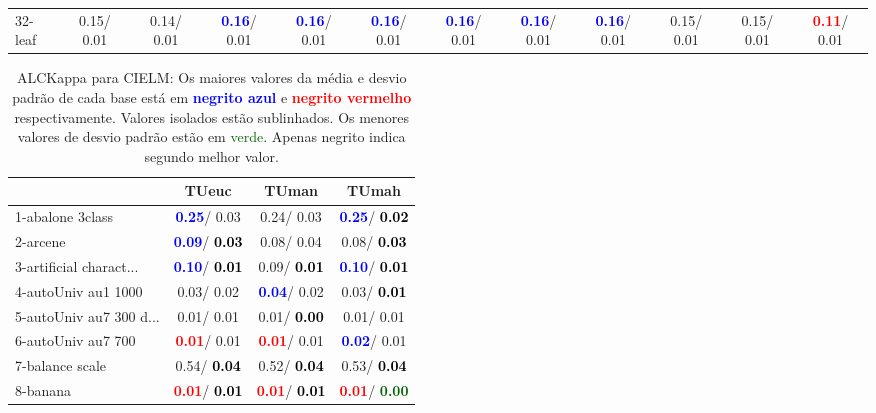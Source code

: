 \begin{table}[h]
\begin{center}
{\begin{tabular}{lc|c|c|c|c|c|c|c|c|c|c}
32-leaf &   0.15/  0.01 &   0.14/  0.01 & \textcolor{blue}{\textbf{  0.16}}/  0.01 & \textcolor{blue}{\textbf{  0.16}}/  0.01 & \textcolor{blue}{\textbf{  0.16}}/  0.01 & \textcolor{blue}{\textbf{  0.16}}/  0.01 & \textcolor{blue}{\textbf{  0.16}}/  0.01 & \textcolor{blue}{\textbf{  0.16}}/  0.01 &   0.15/  0.01 &   0.15/  0.01 & \textcolor{red}{\textbf{  0.11}}/  0.01 \\\end{tabular}}\label{stratsALCKappa0aCIELMRedux}
\end{center}
\end{table}
\begin{table}[h]
\caption{ALCKappa para CIELM: Os maiores valores da média e desvio padrão de cada base está em \textcolor{blue}{\textbf{negrito azul}} e \textcolor{red}{\textbf{negrito vermelho}} respectivamente. Valores isolados estão sublinhados. Os menores valores de desvio padrão estão em \textcolor{darkgreen}{verde}. Apenas negrito indica segundo melhor valor.}
\begin{center}\begin{tabular}{lc|c|c}
 & TUeuc & TUman & TUmah\\ \hline 1-abalone 3class & \textcolor{blue}{\textbf{  0.25}}/  0.03 &   0.24/  0.03 & \textcolor{blue}{\textbf{  0.25}}/\textcolor{black}{\textbf{  0.02}} \\
2-arcene & \textcolor{blue}{\textbf{  0.09}}/\textcolor{black}{\textbf{  0.03}} &   0.08/  0.04 &   0.08/\textcolor{black}{\textbf{  0.03}} \\
3-artificial charact... & \textcolor{blue}{\textbf{  0.10}}/\textcolor{black}{\textbf{  0.01}} &   0.09/\textcolor{black}{\textbf{  0.01}} & \textcolor{blue}{\textbf{  0.10}}/\textcolor{black}{\textbf{  0.01}} \\
4-autoUniv au1 1000 &   0.03/  0.02 & \textcolor{blue}{\textbf{  0.04}}/  0.02 &   0.03/\textcolor{black}{\textbf{  0.01}} \\
5-autoUniv au7 300 d... &   0.01/  0.01 &   0.01/\textcolor{black}{\textbf{  0.00}} &   0.01/  0.01 \\
6-autoUniv au7 700 & \textcolor{red}{\textbf{  0.01}}/  0.01 & \textcolor{red}{\textbf{  0.01}}/  0.01 & \textcolor{blue}{\textbf{  0.02}}/  0.01 \\
7-balance scale &   0.54/\textcolor{black}{\textbf{  0.04}} &   0.52/\textcolor{black}{\textbf{  0.04}} &   0.53/\textcolor{black}{\textbf{  0.04}} \\ \hline
8-banana & \textcolor{red}{\textbf{  0.01}}/\textcolor{black}{\textbf{  0.01}} & \textcolor{red}{\textbf{  0.01}}/\textcolor{black}{\textbf{  0.01}} & \textcolor{red}{\textbf{  0.01}}/\textcolor{darkgreen}{\textbf{  0.00}} \\

\end{tabular}
\end{center}
\end{table}
